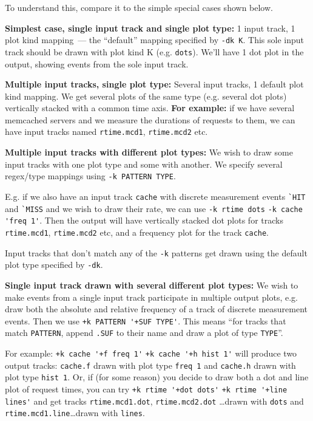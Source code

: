 \documentclass{article}
\begin{document}
To understand this, compare it to the simple special cases shown below.

\textbf{Simplest case, single input track and single plot type:} 1 input track, 1 plot kind mapping~--- the ``default'' mapping specified by \verb|-dk K|. This sole input track should be drawn with plot kind K (e.g. \verb|dots|). We'll have 1 dot plot in the output, showing events from the sole input track.

\textbf{Multiple input tracks, single plot type:} Several input tracks, 1 default plot kind mapping. We get several plots of the same type (e.g. several dot plots) vertically stacked with a common time axis. \textbf{For example:} if we have several memcached servers and we measure the durations of requests to them, we can have input tracks named \verb|rtime.mcd1|, \verb|rtime.mcd2| etc.

\textbf{Multiple input tracks with different plot types:} We wish to draw some input tracks with one plot type and some with another. We specify several regex/type mappings using \verb|-k PATTERN TYPE|. 

E.g. if we also have an input track \verb|cache| with discrete measurement events \verb|`HIT| and \verb|`MISS| and we wish to draw their rate, we can use \verb|-k rtime dots| \verb|-k cache 'freq 1'|. Then the output will have vertically stacked dot plots for tracks \verb|rtime.mcd1|, \verb|rtime.mcd2| etc, and a frequency plot for the track \verb|cache|. 

Input tracks that don't match any of the \verb|-k| patterns get drawn using the default plot type specified by \verb|-dk|.

\textbf{Single input track drawn with several different plot types:} We wish to make events from a single input track participate in multiple output plots, e.g. draw both the absolute and relative frequency of a track of discrete measurement events. Then we use \verb|+k PATTERN '+SUF TYPE'|. This means ``for tracks that match \verb|PATTERN|, append \verb|.SUF| to their name and draw a plot of type \verb|TYPE|''. 

For example: \verb|+k cache '+f freq 1'| \verb|+k cache '+h hist 1'| will produce two output tracks: \verb|cache.f| drawn with plot type \verb|freq 1| and \verb|cache.h| drawn with plot type \verb|hist 1|. Or, if (for some reason) you decide to draw both a dot and line plot of request times, you can try \verb|+k rtime '+dot dots'| \verb|+k rtime '+line lines'| and get tracks \verb|rtime.mcd1.dot|, \verb|rtime.mcd2.dot| \ldots drawn with \verb|dots| and \verb|rtime.mcd1.line|\ldots drawn with \verb|lines|. 
\end{document}
